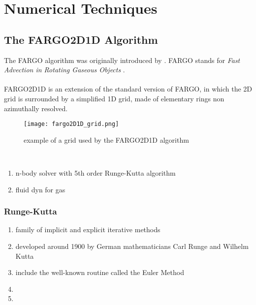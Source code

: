 
\chapter{Numerical Techniques}

  \section{The FARGO2D1D Algorithm}
    The FARGO algorithm was originally introduced by 
    . FARGO stands for 
    \textit{Fast Advection in Rotating Gaseous Objects}
    \cite{paper introducing fargo algorithm}. \\
    \\
    FARGO2D1D is an extension of the standard version of FARGO, in which the 
    2D grid is surrounded by a simplified 1D grid, made of elementary rings 
    non azimuthally resolved.
    \cite{what is FARGO2D1D}
    
    \begin{figure}[h!]
      \centering
      \texttt{[image: fargo2D1D\_grid.png]}
      \caption{example of a grid used by the FARGO2D1D algorithm\cite{2D1D grid}}
      \label{}
    \end{figure} \ \\ 
    
    
    \begin{enumerate}
      \item n-body solver with 5th order Runge-Kutta algorithm
      \item fluid dyn for gas
    \end{enumerate}
    
    \subsection{Runge-Kutta}
      \begin{enumerate}
        \item family of implicit and explicit iterative methods
        \item developed around 1900 by German mathematicians Carl Runge and
          Wilhelm Kutta
        \item include the well-known routine called the Euler Method
        \item
        \item
      \end{enumerate}

